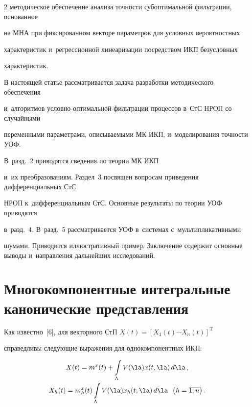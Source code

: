 \begin{multicols}{2}
методическое обеспечение анализа точности субоптимальной фильтрации, основанное 

на МНА при фиксированном векторе параметров для условных вероятностных 

характеристик и~регрессионной линеаризации посредством ИКП безусловных 

характеристик.



В настоящей статье рассматривается задача разработки методического обеспечения 

и~алгоритмов услов\-но-оп\-ти\-маль\-ной фильт\-ра\-ции процессов в~СтС НРОП со случайными 

переменными параметрами, описываемыми МК ИКП, и~моделирования точ\-ности УОФ. 

В~разд.~2 приводятся сведения по теории МК ИКП 

и~их преобразованиям. Раздел~3 посвящен вопросам приведения дифференциальных СтС 

НРОП к~дифференциальным СтС. Основные результаты по теории УОФ приводятся 

в~разд.~4. В~разд.~5 рассматривается УОФ в~системах с~мультипликативными 

шумами. Приводится иллюстративный пример. Заключение содержит основные выводы и~направления дальнейших исследований.





\section{Многокомпонентные интегральные канонические представления}



Как известно~[6], для векторного СтП $X(t) =[ X_1(t) \cdots X_n(t)]^{\mathrm{T}}$ 

справедливы следующие выражения для однокомпонентных ИКП:

    \begin{multline}

    X(t) = m^x (t) + \displaystyle\int\limits_\Lambda V(\la) x (t,\la) \,d\la\,,\\

    X_h(t) = m_h^x (t) \displaystyle \int\limits_\Lambda V(\la) x_h (t,\la) \,d\la\enskip 

\left(h=\overline{1,n}\right).

          \label{e2.1-s2}

     \end{multline}


\end{multicols}
